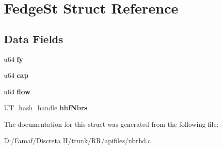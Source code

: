 \hypertarget{struct_fedge_st}{\section{Fedge\+St Struct Reference}
\label{struct_fedge_st}
}
\subsection*{Data Fields}
\begin{DoxyCompactItemize}
\item 
\hypertarget{struct_fedge_st_a4d8322e0449bf61ceafd6b341cae8ddd}{u64 {\bfseries fy}}\label{struct_fedge_st_a4d8322e0449bf61ceafd6b341cae8ddd}

\item 
\hypertarget{struct_fedge_st_a6713999881722a64d8642b2bbec1c032}{u64 {\bfseries cap}}\label{struct_fedge_st_a6713999881722a64d8642b2bbec1c032}

\item 
\hypertarget{struct_fedge_st_a94d792c1c34d1a54b1332660f9722c9b}{u64 {\bfseries flow}}\label{struct_fedge_st_a94d792c1c34d1a54b1332660f9722c9b}

\item 
\hypertarget{struct_fedge_st_aaa91eff5d31068d27dcf40afac024bc2}{\hyperlink{struct_u_t__hash__handle}{U\+T\+\_\+hash\+\_\+handle} {\bfseries hhf\+Nbrs}}\label{struct_fedge_st_aaa91eff5d31068d27dcf40afac024bc2}

\end{DoxyCompactItemize}


The documentation for this struct was generated from the following file\+:\begin{DoxyCompactItemize}
\item 
D\+:/\+Famaf/\+Discreta I\+I/trunk/\+R\+R/apifiles/nbrhd.\+c\end{DoxyCompactItemize}
